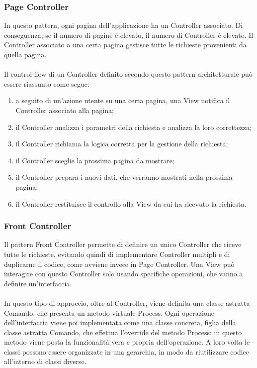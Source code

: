 \subsubsection{Page Controller}
In questo pattern, ogni pagina dell'applicazione ha un Controller associato. Di conseguenza, se il numero di pagine è elevato, il numero di Controller è elevato.
Il Controller associato a una certa pagina gestisce tutte le richieste provenienti da quella pagina.\\
\\
Il control flow di un Controller definito secondo questo pattern architetturale può essere riassunto come segue:
\begin{enumerate}
    \item a seguito di un'azione utente su una certa pagina, una View notifica il Controller associato alla pagina;
    \item il Controller analizza i parametri della richiesta e analizza la loro correttezza;
    \item il Controller richiama la logica corretta per la gestione della richiesta;
    \item il Controller sceglie la prossima pagina da mostrare;
    \item il Controller prepara i nuovi dati, che verranno mostrati nella prossima pagina;
    \item il Controller restituisce il controllo alla View da cui ha ricevuto la richiesta.
\end{enumerate}

\subsubsection{Front Controller}
Il pattern Front Controller permette di definire un unico Controller che riceve tutte le richieste, evitando quindi di implementare Controller multipli e di duplicarne il codice, come avviene invece in Page Controller. Una View può interagire con questo Controller solo usando specifiche operazioni, che vanno a definire un'interfaccia.\\
\\
In questo tipo di approccio, oltre al Controller, viene definita una classe astratta Comando,
che presenta un metodo virtuale Process.
Ogni operazione dell'interfaccia viene poi implementata come una classe concreta, figlia della classe astratta Comando, che effettua l'override del metodo Process: in questo metodo viene posta la funzionalità vera e propria dell'operazione.
A loro volta le classi possono essere organizzate in una gerarchia, in modo da riutilizzare codice all'interno di classi diverse.

